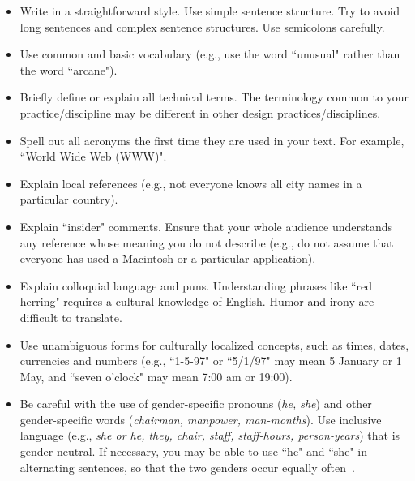 \documentclass{chi-ext}
\begin{document}
\begin{itemize}\compresslist
\item 	
Write in a straightforward style. 
Use simple sentence structure. 
Try to avoid long sentences and complex sentence structures. 
Use semicolons carefully.
\item 	
Use common and basic vocabulary (e.g., use the word ``unusual" rather than the word ``arcane").
\item 	
Briefly define or explain all technical terms. 
The terminology common to your practice/discipline may be different in other design practices/disciplines.
\item 	
Spell out all acronyms the first time they are used in your text. 
For example, ``World Wide Web (WWW)".
\item 	
Explain local references (e.g., not everyone knows all city names in a particular country).
\item 	
Explain ``insider" comments. 
Ensure that your whole audience understands any reference whose meaning you do not describe (e.g., do not assume that everyone has used a Macintosh or a particular application).
\item 	
Explain colloquial language and puns. 
Understanding phrases like ``red herring" requires a cultural knowledge of English. 
Humor and irony are difficult to translate.
\item 	
Use unambiguous forms for culturally localized concepts, such as times, dates, currencies and numbers (e.g., ``1-5-97" or ``5/1/97" may mean 5 January or 1 May, and ``seven o'clock" may mean 7:00 am or 19:00).

\item 	
Be careful with the use of gender-specific pronouns (\emph{he, she}) and other gender-specific words (\emph{chairman, manpower, man-months}). 
Use inclusive language (e.g., \emph{she or he, they, chair, staff, staff-hours, person-years}) that is gender-neutral. 
If necessary, you may be able to use ``he" and ``she" in alternating sentences, so that the two genders occur equally often~\cite{Schwartz95}. 
\end{itemize}
\end{document}
